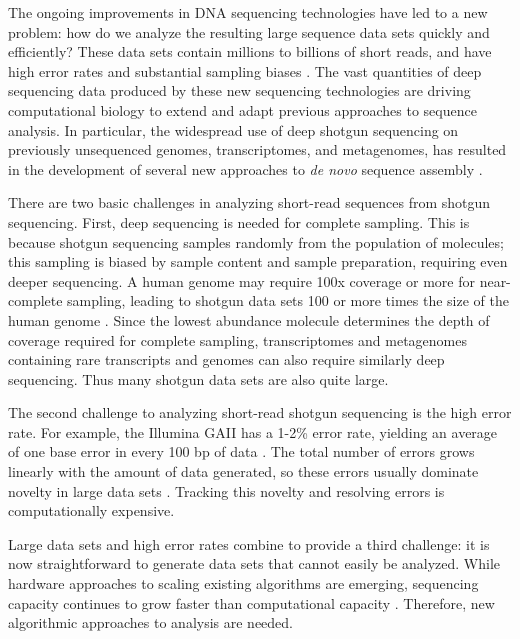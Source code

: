 \documentclass[10pt]{article}
\begin{document}
The ongoing improvements in DNA sequencing technologies have led to a new
problem: how do we analyze the resulting large sequence data sets
quickly and efficiently? These data sets contain millions to billions
of short reads, and have high error rates and substantial sampling
biases \cite{pubmed19997069}.  The vast quantities of deep sequencing data produced by
these new sequencing technologies are driving
computational biology to extend and adapt previous approaches to sequence
analysis.  In
particular, the widespread use of deep shotgun sequencing on
previously unsequenced genomes, transcriptomes, and metagenomes, has
resulted in the development of several new approaches to {\em de novo}
sequence assembly \cite{pubmed20211242}.

There are two basic challenges in analyzing short-read sequences from
shotgun sequencing. First, deep sequencing is needed for complete
sampling. This is because shotgun sequencing samples randomly from the
population of molecules; this sampling is biased by sample content and
sample preparation, requiring even deeper sequencing. A human genome
may require 100x coverage or more for near-complete sampling, leading
to shotgun data sets 100 or more times the size of the human genome
\cite{pubmed21187386}.  Since the lowest abundance molecule determines
the depth of coverage required for complete sampling, transcriptomes
and metagenomes containing rare transcripts and genomes can also
require similarly deep sequencing.  Thus many shotgun data sets are
also quite large.

The second challenge to analyzing short-read shotgun sequencing is the
high error rate.  For example, the Illumina GAII has a 1-2\% error
rate, yielding an average of one base error in every 100 bp of data
\cite{pubmed19997069}.  The total number of errors grows linearly with
the amount of data generated, so these errors usually dominate
novelty in large data sets \cite{pubmed21245053}.  Tracking this
novelty and resolving errors is computationally expensive.

Large data sets and high error rates combine to provide a third
challenge: it is now straightforward to generate data sets that
cannot easily be analyzed.  While hardware approaches to scaling
existing algorithms are emerging, sequencing capacity continues to
grow faster than computational capacity \cite{pubmed20441614}.
Therefore, new algorithmic approaches to analysis are needed.
\end{document}
